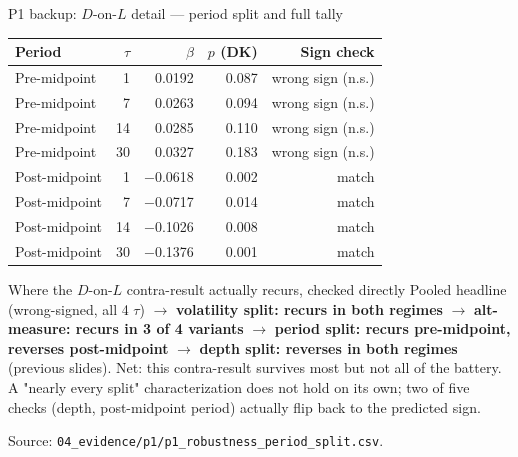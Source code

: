 \documentclass[aspectratio=169]{beamer}
\begin{document}
\begin{frame}{P1 backup: $D$-on-$L$ detail --- period split and full tally}
  \footnotesize
  \begin{center}
  \begin{tabular}{@{}l r r r r@{}}
    \toprule
    Period & $\tau$ & $\beta$ & $p$ (DK) & Sign check \\
    \midrule
    Pre-midpoint  & 1  & 0.0192 & 0.087 & wrong sign (n.s.) \\
    Pre-midpoint  & 7  & 0.0263 & 0.094 & wrong sign (n.s.) \\
    Pre-midpoint  & 14 & 0.0285 & 0.110 & wrong sign (n.s.) \\
    Pre-midpoint  & 30 & 0.0327 & 0.183 & wrong sign (n.s.) \\
    Post-midpoint & 1  & $-$0.0618 & 0.002 & match \\
    Post-midpoint & 7  & $-$0.0717 & 0.014 & match \\
    Post-midpoint & 14 & $-$0.1026 & 0.008 & match \\
    Post-midpoint & 30 & $-$0.1376 & 0.001 & match \\
    \bottomrule
  \end{tabular}
  \end{center}
  \vspace{0.4em}
  \begin{block}{Where the $D$-on-$L$ contra-result actually recurs, checked directly}
    \footnotesize Pooled headline (wrong-signed, all 4 $\tau$) $\to$ \textbf{volatility split: recurs in both regimes} $\to$ \textbf{alt-measure: recurs in 3 of 4 variants} $\to$ \textbf{period split: recurs pre-midpoint, reverses post-midpoint} $\to$ \textbf{depth split: reverses in both regimes} (previous slides). Net: this contra-result survives most but not all of the battery. A "nearly every split" characterization does not hold on its own; two of five checks (depth, post-midpoint period) actually flip back to the predicted sign.
  \end{block}
  {\scriptsize Source: \texttt{04\_evidence/p1/p1\_robustness\_period\_split.csv}.}
\end{frame}
\end{document}
